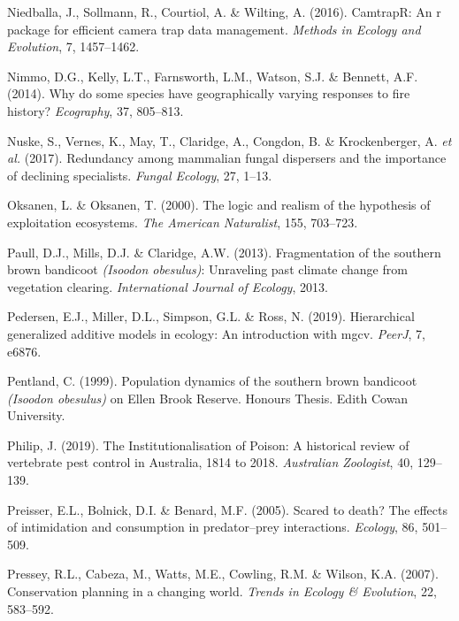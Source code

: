 \documentclass[11pt,a4paper,titlepage,twoside,openright]{style/unimelbthesis}
\begin{document}
\begin{mainmatter}
\leavevmode\hypertarget{ref-niedballa2016}{}%
Niedballa, J., Sollmann, R., Courtiol, A. \& Wilting, A. (2016). CamtrapR: An r package for efficient camera trap data management. \emph{Methods in Ecology and Evolution}, 7, 1457--1462.

\leavevmode\hypertarget{ref-nimmo2014why}{}%
Nimmo, D.G., Kelly, L.T., Farnsworth, L.M., Watson, S.J. \& Bennett, A.F. (2014). Why do some species have geographically varying responses to fire history? \emph{Ecography}, 37, 805--813.

\leavevmode\hypertarget{ref-nuske2017redundancy}{}%
Nuske, S., Vernes, K., May, T., Claridge, A., Congdon, B. \& Krockenberger, A. \emph{et al.} (2017). Redundancy among mammalian fungal dispersers and the importance of declining specialists. \emph{Fungal Ecology}, 27, 1--13.

\leavevmode\hypertarget{ref-oksanen2000logic}{}%
Oksanen, L. \& Oksanen, T. (2000). The logic and realism of the hypothesis of exploitation ecosystems. \emph{The American Naturalist}, 155, 703--723.

\leavevmode\hypertarget{ref-paull2013fragmentation}{}%
Paull, D.J., Mills, D.J. \& Claridge, A.W. (2013). Fragmentation of the southern brown bandicoot \emph{(Isoodon obesulus)}: Unraveling past climate change from vegetation clearing. \emph{International Journal of Ecology}, 2013.

\leavevmode\hypertarget{ref-pedersen2019hierarchical}{}%
Pedersen, E.J., Miller, D.L., Simpson, G.L. \& Ross, N. (2019). Hierarchical generalized additive models in ecology: An introduction with mgcv. \emph{PeerJ}, 7, e6876.

\leavevmode\hypertarget{ref-pentland1999population}{}%
Pentland, C. (1999). Population dynamics of the southern brown bandicoot \emph{(Isoodon obesulus)} on Ellen Brook Reserve. Honours Thesis. Edith Cowan University.

\leavevmode\hypertarget{ref-philip2019institutionalisation}{}%
Philip, J. (2019). The Institutionalisation of Poison: A historical review of vertebrate pest control in Australia, 1814 to 2018. \emph{Australian Zoologist}, 40, 129--139.

\leavevmode\hypertarget{ref-preisser2005scared}{}%
Preisser, E.L., Bolnick, D.I. \& Benard, M.F. (2005). Scared to death? The effects of intimidation and consumption in predator--prey interactions. \emph{Ecology}, 86, 501--509.

\leavevmode\hypertarget{ref-pressey2007conservation}{}%
Pressey, R.L., Cabeza, M., Watts, M.E., Cowling, R.M. \& Wilson, K.A. (2007). Conservation planning in a changing world. \emph{Trends in Ecology \& Evolution}, 22, 583--592.


\end{mainmatter}
\end{document}
